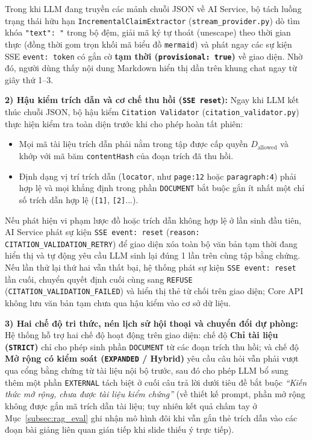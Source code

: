 \documentclass{IEEEtran}
\begin{document}
Trong khi LLM đang truyền các mảnh chuỗi JSON về AI Service, bộ tách luồng trạng thái hữu hạn \texttt{IncrementalClaimExtractor} (\texttt{stream\_provider.py}) dò tìm khóa \texttt{"text": "} trong bộ đệm, giải mã ký tự thoát (unescape) theo thời gian thực (đồng thời gom trọn khối mã biểu đồ \texttt{mermaid}) và phát ngay các sự kiện SSE \texttt{event: token} có gắn cờ \textbf{tạm thời (\texttt{provisional: true})} về giao diện. Nhờ đó, người dùng thấy nội dung Markdown hiển thị dần trên khung chat ngay từ giây thứ 1--3.

\textbf{2) Hậu kiểm trích dẫn và cơ chế thu hồi (\texttt{SSE reset}):}
Ngay khi LLM kết thúc chuỗi JSON, bộ hậu kiểm \texttt{Citation Validator} (\texttt{citation\_validator.py}) thực hiện kiểm tra toàn diện trước khi cho phép hoàn tất phiên:
\begin{itemize}
    \item Mọi mã tài liệu trích dẫn phải nằm trong tập được cấp quyền $D_{\text{allowed}}$ và khớp với mã băm \texttt{contentHash} của đoạn trích đã thu hồi.
    \item Định dạng vị trí trích dẫn (\texttt{locator}, như \texttt{page:12} hoặc \texttt{paragraph:4}) phải hợp lệ và mọi khẳng định trong phần \texttt{DOCUMENT} bắt buộc gắn ít nhất một chỉ số trích dẫn hợp lệ (\texttt{[1]}, \texttt{[2]}...).
\end{itemize}
Nếu phát hiện vi phạm lược đồ hoặc trích dẫn không hợp lệ ở lần sinh đầu tiên, AI Service phát sự kiện \texttt{SSE event: reset} (\texttt{reason: CITATION\_VALIDATION\_RETRY}) để giao diện xóa toàn bộ văn bản tạm thời đang hiển thị và tự động yêu cầu LLM sinh lại đúng 1 lần trên cùng tập bằng chứng. Nếu lần thử lại thứ hai vẫn thất bại, hệ thống phát sự kiện \texttt{SSE event: reset} lần cuối, chuyển quyết định cuối cùng sang \texttt{REFUSE} (\texttt{CITATION\_VALIDATION\_FAILED}) và hiển thị thẻ từ chối trên giao diện; Core API không lưu văn bản tạm chưa qua hậu kiểm vào cơ sở dữ liệu.

\textbf{3) Hai chế độ tri thức, nén lịch sử hội thoại và chuyển đổi dự phòng:}
Hệ thống hỗ trợ hai chế độ hoạt động trên giao diện: chế độ \textbf{Chỉ tài liệu (\texttt{STRICT})} chỉ cho phép sinh phần \texttt{DOCUMENT} từ các đoạn trích thu hồi; và chế độ \textbf{Mở rộng có kiểm soát (\texttt{EXPANDED} / Hybrid)} yêu cầu câu hỏi vẫn phải vượt qua cổng bằng chứng từ tài liệu nội bộ trước, sau đó cho phép LLM bổ sung thêm một phần \texttt{EXTERNAL} tách biệt ở cuối câu trả lời dưới tiêu đề bắt buộc \textit{``Kiến thức mở rộng, chưa được tài liệu kiểm chứng''} (về thiết kế prompt, phần mở rộng không được gắn mã trích dẫn tài liệu; tuy nhiên kết quả chấm tay ở Mục~\ref{subsec:rag_eval} ghi nhận mô hình đôi khi vẫn gắn thẻ trích dẫn vào các đoạn bài giảng liên quan gián tiếp khi slide thiếu ý trực tiếp).
\end{document}
